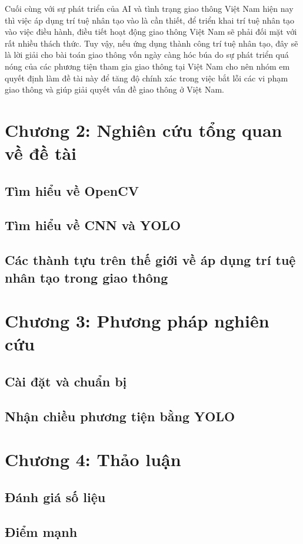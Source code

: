 \documentclass[14pt,oneside,a4paper]{extreport}
\begin{document}
Cuối cùng với sự phát triển của AI và tình trạng giao thông Việt Nam hiện nay thì việc áp dụng trí tuệ nhân tạo vào là cần thiết, để triển khai trí tuệ nhân tạo vào việc điều hành, điều tiết hoạt động giao thông Việt Nam sẽ phải đối mặt với rất nhiều thách thức. Tuy vậy, nếu ứng dụng thành công trí tuệ nhân tạo, đây sẽ là lời giải cho bài toán giao thông vốn ngày càng hóc búa do sự phát triển quá nóng của các phương tiện tham gia giao thông tại Việt Nam cho nên nhóm em quyết định làm đề tài này để tăng độ chính xác trong việc bắt lỗi các vi phạm giao thông và giúp giải quyết vấn đề giao thông ở Việt Nam.

\section{Chương 2: Nghiên cứu tổng quan về đề tài}
\subsection{Tìm hiểu về OpenCV}
\subsection{Tìm hiểu về CNN và YOLO}
\subsection{Các thành tựu trên thế giới về áp dụng trí tuệ nhân tạo trong giao thông}
\section{Chương 3: Phương pháp nghiên cứu}
\subsection{Cài đặt và chuẩn bị}
\subsection{Nhận chiều phương tiện bằng YOLO}
\section{Chương 4: Thảo luận}
\subsection{Đánh giá số liệu}
\subsection{Điểm mạnh}
\end{document}
